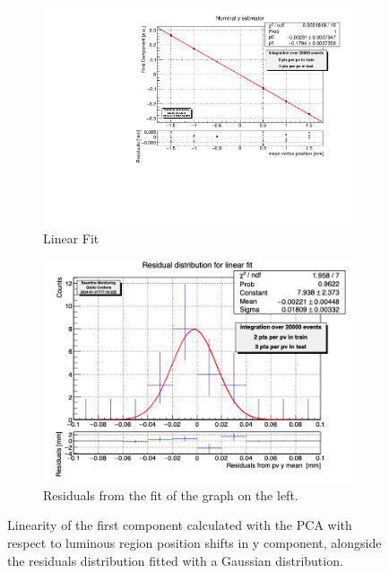 \begin{figure}
    \centering
    \begin{subfigure}{0.48\textwidth}
    \includegraphics[width=\linewidth]{figures/y_fit_MC.pdf}
    \caption{Linear Fit}\label{fig:yfit_MC}
    \end{subfigure}
    \begin{subfigure}{0.48\textwidth}
    \includegraphics[width=\linewidth]{figures/y_res_MC.png}
    \caption{Residuals from the fit of the graph on the left. }\label{fig:yres_MC}
    \end{subfigure}
    \caption{Linearity of the first component calculated with the PCA with respect to luminous region position shifts in y component, alongside the residuals distribution fitted with a Gaussian distribution.}
    \label{fig:y_MC}
\end{figure}


